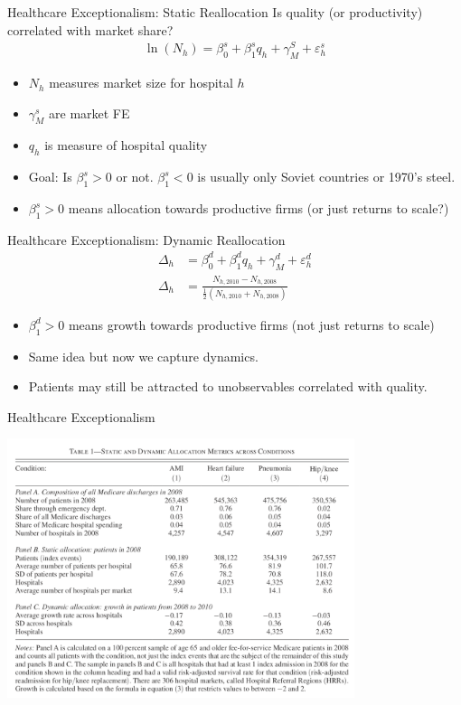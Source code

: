 \documentclass[xcolor=pdftex,dvipsnames,table,mathserif,aspectratio=169]{beamer}
\begin{document}
\begin{frame}{Healthcare Exceptionalism: Static Reallocation}
Is \alert{quality} (or productivity) correlated with \alert{market share}?
\begin{align*}
\ln \left(N_{h}\right)=\beta_{0}^{s}+\beta_{1}^{s} q_{h}+\gamma_{M}^{S}+\varepsilon_{h}^{s}
\end{align*}
\begin{itemize}
\item $N_h$ measures market size for hospital $h$
\item $\gamma_M^s$ are market FE
\item $q_h$ is measure of hospital quality
\item Goal: Is $\beta_1^s>0$ or not. $\beta_1^s<0$ is usually only Soviet countries or 1970's steel.
\item $\beta_1^s>0$ means allocation towards productive firms (or just returns to scale?)
\end{itemize}
\end{frame}

\begin{frame}{Healthcare Exceptionalism: Dynamic Reallocation}
\begin{align*}
\Delta_{h}&=\beta_{0}^{d}+\beta_{1}^{d} q_{h}+\gamma_{M}^{d}+\varepsilon_{h}^{d}\\
\Delta_{h}&=\frac{N_{h, 2010}-N_{h, 2008}}{\frac{1}{2}\left(N_{h, 2010}+N_{h, 2008}\right)}
\end{align*}
\begin{itemize}
\item $\beta_1^d>0$ means growth towards productive firms (not just returns to scale)
\item Same idea but now we capture \alert{dynamics}.
\item Patients may still be attracted to \alert{unobservables correlated with quality}.
\end{itemize}
\end{frame}


\begin{frame}{Healthcare Exceptionalism}
\begin{center}
\includegraphics[width=4in]{./resources/hc1.png}
\end{center}
\end{frame}
\end{document}
